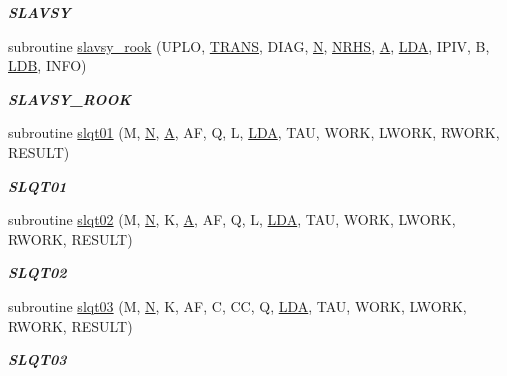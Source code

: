 \begin{DoxyCompactItemize}
\begin{DoxyCompactList}\small\item\em {\bfseries S\+L\+A\+V\+S\+Y} \end{DoxyCompactList}\item 
subroutine \hyperlink{group__single__lin_ga6754c7072d3f2876bc7b4ede7d286ef5}{slavsy\+\_\+rook} (U\+P\+L\+O, \hyperlink{superlu__enum__consts_8h_a0c4e17b2d5cea33f9991ccc6a6678d62a1f61e3015bfe0f0c2c3fda4c5a0cdf58}{T\+R\+A\+N\+S}, D\+I\+A\+G, \hyperlink{polmisc_8c_a0240ac851181b84ac374872dc5434ee4}{N}, \hyperlink{example__user_8c_aa0138da002ce2a90360df2f521eb3198}{N\+R\+H\+S}, \hyperlink{classA}{A}, \hyperlink{example__user_8c_ae946da542ce0db94dced19b2ecefd1aa}{L\+D\+A}, I\+P\+I\+V, B, \hyperlink{example__user_8c_a50e90a7104df172b5a89a06c47fcca04}{L\+D\+B}, I\+N\+F\+O)
\begin{DoxyCompactList}\small\item\em {\bfseries S\+L\+A\+V\+S\+Y\+\_\+\+R\+O\+O\+K} \end{DoxyCompactList}\item 
subroutine \hyperlink{group__single__lin_gaae0b07fde995a5da80d8b88da702911e}{slqt01} (M, \hyperlink{polmisc_8c_a0240ac851181b84ac374872dc5434ee4}{N}, \hyperlink{classA}{A}, A\+F, Q, L, \hyperlink{example__user_8c_ae946da542ce0db94dced19b2ecefd1aa}{L\+D\+A}, T\+A\+U, W\+O\+R\+K, L\+W\+O\+R\+K, R\+W\+O\+R\+K, R\+E\+S\+U\+L\+T)
\begin{DoxyCompactList}\small\item\em {\bfseries S\+L\+Q\+T01} \end{DoxyCompactList}\item 
subroutine \hyperlink{group__single__lin_ga414e808b4bcb191337fddad2c1ca6024}{slqt02} (M, \hyperlink{polmisc_8c_a0240ac851181b84ac374872dc5434ee4}{N}, K, \hyperlink{classA}{A}, A\+F, Q, L, \hyperlink{example__user_8c_ae946da542ce0db94dced19b2ecefd1aa}{L\+D\+A}, T\+A\+U, W\+O\+R\+K, L\+W\+O\+R\+K, R\+W\+O\+R\+K, R\+E\+S\+U\+L\+T)
\begin{DoxyCompactList}\small\item\em {\bfseries S\+L\+Q\+T02} \end{DoxyCompactList}\item 
subroutine \hyperlink{group__single__lin_ga79ba636b9daa261e8bcaef76726d4b4d}{slqt03} (M, \hyperlink{polmisc_8c_a0240ac851181b84ac374872dc5434ee4}{N}, K, A\+F, C, C\+C, Q, \hyperlink{example__user_8c_ae946da542ce0db94dced19b2ecefd1aa}{L\+D\+A}, T\+A\+U, W\+O\+R\+K, L\+W\+O\+R\+K, R\+W\+O\+R\+K, R\+E\+S\+U\+L\+T)
\begin{DoxyCompactList}\small\item\em {\bfseries S\+L\+Q\+T03} \end{DoxyCompactList}\item 

\end{DoxyCompactItemize}
